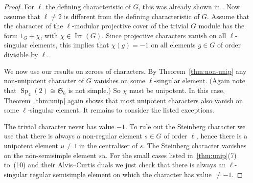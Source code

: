 \documentclass{ert-l}
\newcommand{\fS}{{\mathfrak{S}}}
\newcommand{\Irr}{{\operatorname{Irr}}}
\newcommand{\Sp}{{\operatorname{Sp}}}
\theoremstyle{definition}
\theoremstyle{remark}
\begin{document}
\begin{proof}
For $\ell$ the defining characteristic of $G$, this was already shown in
\cite{KKS}. Now assume that $\ell \neq 2$ is different from the defining
characteristic of $G$.
Assume that the character of the $\ell$-modular projective cover of the
trivial $G$ module has the form $1_G+\chi$, with $\chi\in\Irr(G)$. Since
projective characters vanish on all $\ell$-singular elements, this implies
that $\chi(g)=-1$ on all elements $g\in G$ of order divisible by $\ell$.

We now use our results on zeroes of characters. By Theorem~\ref{thm:non-unip}
any non-unipotent character of $G$ vanishes on some $\ell$-singular element.
(Again note that $\Sp_4(2)\cong\fS_6$ is not simple.)
So $\chi$ must be unipotent. In this case, Theorem~\ref{thm:unip}
again shows that most unipotent characters also vanish on some
$\ell$-singular element. It remains to consider the listed exceptions.

The trivial character never has value $-1$. To rule out the Steinberg
character we use that there is always a non-regular element $s \in G$
of order $\ell$, hence there is a unipotent element $u \neq 1$ in the
centraliser of $s$. The Steinberg character vanishes on the non-semisimple
element $su$. For the small cases listed in~\ref{thm:unip}(7) to~(10)
and their Alvis--Curtis duals we just check that there is always an
$\ell$-singular regular  semisimple element on which the character has
value $\neq -1$.


\end{proof}
\end{document}
